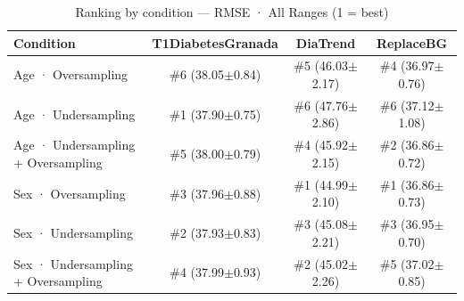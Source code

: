 \begin{table}[htbp]
\centering
\small
\caption{Ranking by condition — RMSE · All Ranges  (1 = best)}
\label{tab:ranking_rmse_entire_family_mechanism_random}
\begin{tabular}{lccc}
\toprule
\textbf{Condition} & \textbf{T1DiabetesGranada} & \textbf{DiaTrend} & \textbf{ReplaceBG} \\
\midrule
Age · Oversampling & \#6 (38.05$\pm$0.84) & \#5 (46.03$\pm$2.17) & \#4 (36.97$\pm$0.76) \\
Age · Undersampling & \#1 (37.90$\pm$0.75) & \#6 (47.76$\pm$2.86) & \#6 (37.12$\pm$1.08) \\
Age · Undersampling + Oversampling & \#5 (38.00$\pm$0.79) & \#4 (45.92$\pm$2.15) & \#2 (36.86$\pm$0.72) \\
\midrule
Sex · Oversampling & \#3 (37.96$\pm$0.88) & \#1 (44.99$\pm$2.10) & \#1 (36.86$\pm$0.73) \\
Sex · Undersampling & \#2 (37.93$\pm$0.83) & \#3 (45.08$\pm$2.21) & \#3 (36.95$\pm$0.70) \\
Sex · Undersampling + Oversampling & \#4 (37.99$\pm$0.93) & \#2 (45.02$\pm$2.26) & \#5 (37.02$\pm$0.85) \\
\bottomrule
\end{tabular}
\end{table}